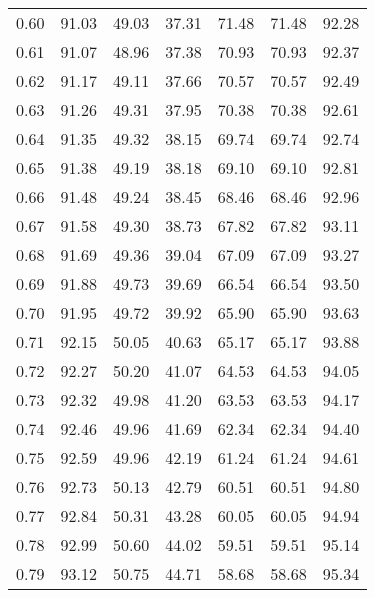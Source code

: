 \begin{tabular}{|c|c|c|c|c|c|c|}
      0.60 &     91.03 &     49.03 &      37.31 &   71.48 &      71.48 &         92.28 \\
      0.61 &     91.07 &     48.96 &      37.38 &   70.93 &      70.93 &         92.37 \\
      0.62 &     91.17 &     49.11 &      37.66 &   70.57 &      70.57 &         92.49 \\
      0.63 &     91.26 &     49.31 &      37.95 &   70.38 &      70.38 &         92.61 \\
      0.64 &     91.35 &     49.32 &      38.15 &   69.74 &      69.74 &         92.74 \\
      0.65 &     91.38 &     49.19 &      38.18 &   69.10 &      69.10 &         92.81 \\
      0.66 &     91.48 &     49.24 &      38.45 &   68.46 &      68.46 &         92.96 \\
      0.67 &     91.58 &     49.30 &      38.73 &   67.82 &      67.82 &         93.11 \\
      0.68 &     91.69 &     49.36 &      39.04 &   67.09 &      67.09 &         93.27 \\
      0.69 &     91.88 &     49.73 &      39.69 &   66.54 &      66.54 &         93.50 \\
      0.70 &     91.95 &     49.72 &      39.92 &   65.90 &      65.90 &         93.63 \\
      0.71 &     92.15 &     50.05 &      40.63 &   65.17 &      65.17 &         93.88 \\
      0.72 &     92.27 &     50.20 &      41.07 &   64.53 &      64.53 &         94.05 \\
      0.73 &     92.32 &     49.98 &      41.20 &   63.53 &      63.53 &         94.17 \\
      0.74 &     92.46 &     49.96 &      41.69 &   62.34 &      62.34 &         94.40 \\
      0.75 &     92.59 &     49.96 &      42.19 &   61.24 &      61.24 &         94.61 \\
      0.76 &     92.73 &     50.13 &      42.79 &   60.51 &      60.51 &         94.80 \\
      0.77 &     92.84 &     50.31 &      43.28 &   60.05 &      60.05 &         94.94 \\
      0.78 &     92.99 &     50.60 &      44.02 &   59.51 &      59.51 &         95.14 \\
      0.79 &     93.12 &     50.75 &      44.71 &   58.68 &      58.68 &         95.34 \\

\end{tabular}
